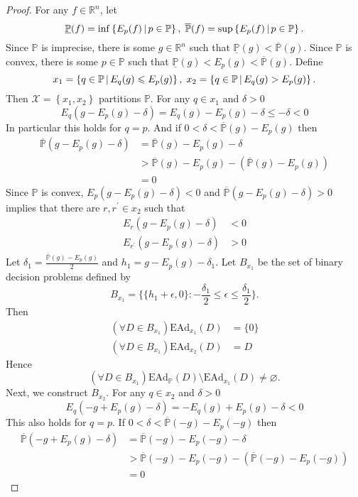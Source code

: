\documentclass[a4paper]{article}
\newcommand\X{\mathcal{X}}
\renewcommand\P{\mathbb{P}} %
\newcommand\EAd{\mathrm{EAd}}
\newcommand{\IP}{\P}
\newcommand\SetDelimiter[1][]{
	\nonscript\,#1\vert \allowbreak \nonscript\,\mathopen{}}
\providecommand\given{\SetDelimiter}
\renewcommand{\leq}{\leqslant}
\newenvironment{CCM rewritten}
{\begingroup\color{blue}} %
{\endgroup}              %
\begin{document}
\begin{proof}
For any $f\in \mathbb{R}^n$, let 
\[
\underline{\IP}(f)=\inf\left\{E_p(f)\given p\in\IP\right\},\; \overline{\IP}(f)=\sup\left\{E_p(f)\given p\in\IP\right\}.
\]
Since $\IP$ is imprecise, there is some $g\in \mathbb{R}^n$ such that $\underline{\IP}(g)<\overline{\IP}(g)$. Since $\IP$ is convex, there is some $p\in\IP$ such that $\underline{\IP}(g)<E_p(g)<\overline{\IP}(g)$. Define 
\[
x_1=\left\{q\in\IP\given E_q(g)\leq E_p(g)\right\},\; x_2=\left\{q\in\IP\given E_q(g)>E_p(g)\right\}.
\]
Then $\X=\left\{x_1,x_2\right\}$ partitions $\IP$. For any $q\in x_1$ and $\delta>0$
\[
E_q(g-E_p(g)-\delta)=E_q(g)-E_p(g)-\delta\leq-\delta<0
\]
In particular this holds for $q=p$. And if $0<\delta<\overline{\IP}(g)-E_p(g)$ then
\begin{align}
\overline{\IP}(g-E_p(g)-\delta)&=\overline{\IP}(g)-E_p(g)-\delta\\
&>\overline{\IP}(g)-E_p(g)-(\overline{\IP}(g)-E_p(g))\\
&=0
\end{align}
Since $\IP$ is convex, $E_p(g-E_p(g)-\delta)<0$ and $\overline{\IP}(g-E_p(g)-\delta)>0$ implies that there are $r,r^\prime\in x_2$ such that 
\begin{align}
E_r(g-E_p(g)-\delta)&<0\\
E_{r^\prime}(g-E_p(g)-\delta)&>0
\end{align}
Let $\delta_1=\frac{\overline{\IP}(g)-E_p(g)}{2}$ and $h_1=g-E_p(g)-\delta_1$. Let $B_{x_1}$ be the set of binary decision problems defined by
$$
B_{x_1} = \{ \{h_1+\epsilon,0\} : -\frac{\delta_1}{2}\leq\epsilon\leq\frac{\delta_1}{2} \}.
$$
Then
\begin{align}
(\forall D\in B_{x_1})\EAd_{x_1}(D)&=\{0\}\\
(\forall D\in B_{x_1})\EAd_{x_2}(D)&=D
\end{align}
Hence
\[
(\forall D\in B_{x_1})\EAd_\IP(D)\setminus\EAd_{x_1}(D)\not=\varnothing.
\]
Next, we construct $B_{x_2}$. For any $q\in x_2$ and $\delta>0$
\[
E_q(-g+E_p(g)-\delta)=-E_q(g)+E_p(g)-\delta<0
\]
This also holds for $q=p$. If $0<\delta<\overline{\IP}(-g)-E_p(-g)$ then
\begin{align}
\overline{\IP}(-g+E_p(g)-\delta)&=\overline{\IP}(-g)-E_p(-g)-\delta\\
&>\overline{\IP}(-g)-E_p(-g)-(\overline{\IP}(-g)-E_p(-g))\\
&=0
\end{align}

\end{proof}
\end{document}
